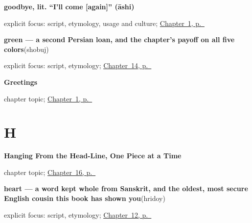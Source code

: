 \noindent\begin{minipage}[t]{\linewidth}
\raggedright
\textbf{goodbye, lit. \textquotedblleft{}I'll come {[}again{]}\textquotedblright{} (āshi)}\enspace\emph{}\par
\footnotesize explicit focus: script, etymology, usage and culture; \hyperref[ch:greetings]{Chapter~1, p.~\pageref*{ch:greetings}}
\end{minipage}\par\smallskip

\noindent\begin{minipage}[t]{\linewidth}
\raggedright
\textbf{green — a second Persian loan, and the chapter's payoff on all five colors}\enspace\emph{}\enspace(shobuj)\par
\footnotesize explicit focus: script, etymology; \hyperref[ch:bn-five-colors]{Chapter~14, p.~\pageref*{ch:bn-five-colors}}
\end{minipage}\par\smallskip

\noindent\begin{minipage}[t]{\linewidth}
\raggedright
\textbf{Greetings}\par
\footnotesize chapter topic; \hyperref[ch:greetings]{Chapter~1, p.~\pageref*{ch:greetings}}
\end{minipage}\par\smallskip

\section*{H}

\noindent\begin{minipage}[t]{\linewidth}
\raggedright
\textbf{Hanging From the Head-Line, One Piece at a Time}\par
\footnotesize chapter topic; \hyperref[ch:bn-script-first]{Chapter~16, p.~\pageref*{ch:bn-script-first}}
\end{minipage}\par\smallskip

\noindent\begin{minipage}[t]{\linewidth}
\raggedright
\textbf{heart — a word kept whole from Sanskrit, and the oldest, most secure English cousin this book has shown you}\enspace\emph{}\enspace(hridoy)\par
\footnotesize explicit focus: script, etymology; \hyperref[ch:bn-eye-mouth-nose-heart]{Chapter~12, p.~\pageref*{ch:bn-eye-mouth-nose-heart}}
\end{minipage}\par\smallskip

